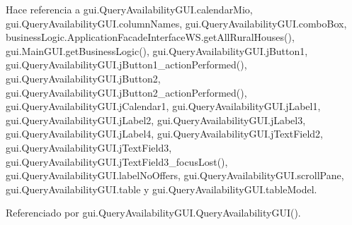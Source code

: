 \begin{DoxyCode}{0}

\end{DoxyCode}


Hace referencia a gui.\+Query\+Availability\+G\+U\+I.\+calendar\+Mio, gui.\+Query\+Availability\+G\+U\+I.\+column\+Names, gui.\+Query\+Availability\+G\+U\+I.\+combo\+Box, business\+Logic.\+Application\+Facade\+Interface\+W\+S.\+get\+All\+Rural\+Houses(), gui.\+Main\+G\+U\+I.\+get\+Business\+Logic(), gui.\+Query\+Availability\+G\+U\+I.\+j\+Button1, gui.\+Query\+Availability\+G\+U\+I.\+j\+Button1\+\_\+action\+Performed(), gui.\+Query\+Availability\+G\+U\+I.\+j\+Button2, gui.\+Query\+Availability\+G\+U\+I.\+j\+Button2\+\_\+action\+Performed(), gui.\+Query\+Availability\+G\+U\+I.\+j\+Calendar1, gui.\+Query\+Availability\+G\+U\+I.\+j\+Label1, gui.\+Query\+Availability\+G\+U\+I.\+j\+Label2, gui.\+Query\+Availability\+G\+U\+I.\+j\+Label3, gui.\+Query\+Availability\+G\+U\+I.\+j\+Label4, gui.\+Query\+Availability\+G\+U\+I.\+j\+Text\+Field2, gui.\+Query\+Availability\+G\+U\+I.\+j\+Text\+Field3, gui.\+Query\+Availability\+G\+U\+I.\+j\+Text\+Field3\+\_\+focus\+Lost(), gui.\+Query\+Availability\+G\+U\+I.\+label\+No\+Offers, gui.\+Query\+Availability\+G\+U\+I.\+scroll\+Pane, gui.\+Query\+Availability\+G\+U\+I.\+table y gui.\+Query\+Availability\+G\+U\+I.\+table\+Model.



Referenciado por gui.\+Query\+Availability\+G\+U\+I.\+Query\+Availability\+G\+U\+I().

\mbox{\label{classgui_1_1_query_availability_g_u_i_adfddf3f903e7257285aba07de30efb83}} 
